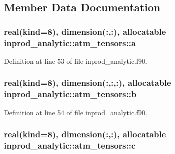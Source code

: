 \subsection{Member Data Documentation}
\hypertarget{structinprod__analytic_1_1atm__tensors_af50962da7a48c98d8b118dee9cc16dcd}{
\subsubsection[{a}]{\setlength{\rightskip}{0pt plus 5cm}real(kind=8), dimension(\-:,\-:), allocatable inprod\-\_\-analytic\-::atm\-\_\-tensors\-::a\hspace{0.3cm}{\ttfamily [private]}}}\label{structinprod__analytic_1_1atm__tensors_af50962da7a48c98d8b118dee9cc16dcd}


Definition at line 53 of file inprod\-\_\-analytic.\-f90.

\hypertarget{structinprod__analytic_1_1atm__tensors_aa6b446e5bd3e7ea7278f1c1cad7f46cf}{
\subsubsection[{b}]{\setlength{\rightskip}{0pt plus 5cm}real(kind=8), dimension(\-:,\-:,\-:), allocatable inprod\-\_\-analytic\-::atm\-\_\-tensors\-::b\hspace{0.3cm}{\ttfamily [private]}}}\label{structinprod__analytic_1_1atm__tensors_aa6b446e5bd3e7ea7278f1c1cad7f46cf}


Definition at line 54 of file inprod\-\_\-analytic.\-f90.

\hypertarget{structinprod__analytic_1_1atm__tensors_a6f560bb68ce7081409034cb755e7a164}{
\subsubsection[{c}]{\setlength{\rightskip}{0pt plus 5cm}real(kind=8), dimension(\-:,\-:), allocatable inprod\-\_\-analytic\-::atm\-\_\-tensors\-::c\hspace{0.3cm}{\ttfamily [private]}}}\label{structinprod__analytic_1_1atm__tensors_a6f560bb68ce7081409034cb755e7a164}


